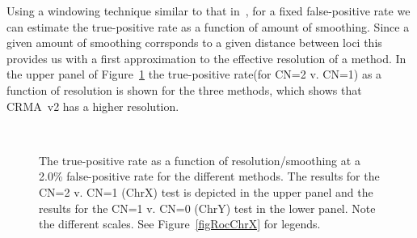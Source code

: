 \documentclass{bioinfo}
\newcommand{\TPrate}{true-positive rate\xspace}
\newcommand{\FPrate}{false-positive rate\xspace}
\begin{document}
Using a windowing technique similar to that in~\citet{BengtssonH_etal_2008}, for a fixed \FPrate we can estimate the \TPrate as a function of amount of smoothing.  Since a given amount of smoothing corrsponds to a given distance between loci this provides us with a first approximation to the effective resolution of a method.  In the upper panel of Figure~\ref{figTPvResolutionChrXY} the \TPrate (for CN=2 v. CN=1) as a function of resolution is shown for the three methods, which shows that CRMA~v2 has a higher resolution.
\begin{figure}[!tpbh]
\begin{center}
   \\
\end{center}
 \caption{
   The \TPrate as a function of resolution/smoothing at a 2.0\% \FPrate for the different methods.
   The results for the CN=2 v. CN=1 (ChrX) test is depicted in the upper panel
   and the results for the CN=1 v. CN=0 (ChrY) test in the lower panel.
   Note the different scales.  See Figure~\ref{figRocChrX} for legends.
 }
 \label{figTPvResolutionChrXY}
\end{figure}
\end{document}
